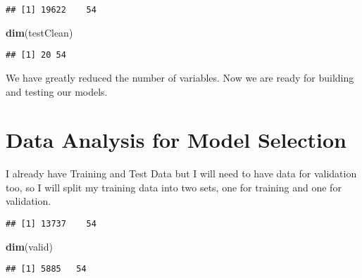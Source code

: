 \documentclass[]{article}
\newenvironment{Shaded}{\begin{snugshade}}{\end{snugshade}}
\newcommand{\DataTypeTok}[1]{\textcolor[rgb]{0.13,0.29,0.53}{#1}}
\newcommand{\FloatTok}[1]{\textcolor[rgb]{0.00,0.00,0.81}{#1}}
\newcommand{\KeywordTok}[1]{\textcolor[rgb]{0.13,0.29,0.53}{\textbf{#1}}}
\newcommand{\NormalTok}[1]{#1}
\newcommand{\OperatorTok}[1]{\textcolor[rgb]{0.81,0.36,0.00}{\textbf{#1}}}
\newcommand{\OtherTok}[1]{\textcolor[rgb]{0.56,0.35,0.01}{#1}}
\newcommand{\StringTok}[1]{\textcolor[rgb]{0.31,0.60,0.02}{#1}}
\begin{document}
\begin{verbatim}
## [1] 19622    54
\end{verbatim}

\begin{Shaded}
\begin{Highlighting}[]
\KeywordTok{dim}\NormalTok{(testClean)}
\end{Highlighting}
\end{Shaded}

\begin{verbatim}
## [1] 20 54
\end{verbatim}

We have greatly reduced the number of variables. Now we are ready for
building and testing our models.

\hypertarget{data-analysis-for-model-selection}{%
\section{Data Analysis for Model
Selection}\label{data-analysis-for-model-selection}}

I already have Training and Test Data but I will need to have data for
validation too, so I will split my training data into two sets, one for
training and one for validation.

\begin{Shaded}
\end{Shaded}

\begin{verbatim}
## [1] 13737    54
\end{verbatim}

\begin{Shaded}
\begin{Highlighting}[]
\KeywordTok{dim}\NormalTok{(valid)}
\end{Highlighting}
\end{Shaded}

\begin{verbatim}
## [1] 5885   54
\end{verbatim}
\end{document}
